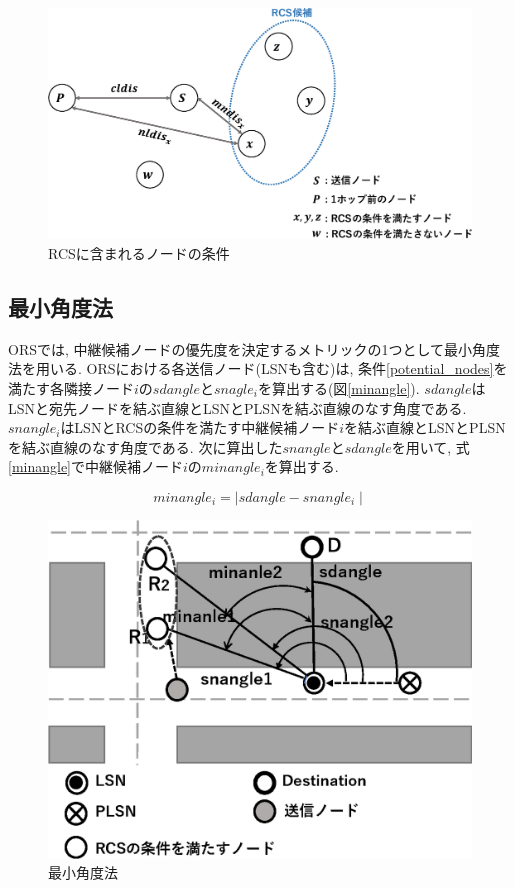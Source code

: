 \documentclass[10pt]{jreport}
\begin{document}
\begin{figure}[!ht]
	\centering
	\includegraphics[width=150mm]{figures/Condition_RCS.eps}
	\caption{RCSに含まれるノードの条件}
	\label{fig:Condition_RCS}
\end{figure}


\subsection{最小角度法}
ORSでは, 中継候補ノードの優先度を決定するメトリックの1つとして最小角度法を用いる. ORSにおける各送信ノード(LSNも含む)は, 条件\ref{potential_nodes}を満たす各隣接ノード$i$の$sdangle$と$snagle_i$を算出する(図\ref{minangle}).
$sdangle$はLSNと宛先ノードを結ぶ直線とLSNとPLSNを結ぶ直線のなす角度である. $snangle_i$はLSNとRCSの条件を満たす中継候補ノード$i$を結ぶ直線とLSNとPLSNを結ぶ直線のなす角度である. 
次に算出した$snangle$と$sdangle$を用いて, 式\ref{minangle}で中継候補ノード$i$の$minangle_i$を算出する.

\begin{equation}
	\label{minangle}
	minangle_i = \mid sdangle - snangle_i \mid
\end{equation}

\begin{figure}[!ht]
	\centering
	\includegraphics[width=130mm]{figures/minangle.eps}
	\caption{最小角度法}
	\label{fig:minangle}
\end{figure}
\end{document}
